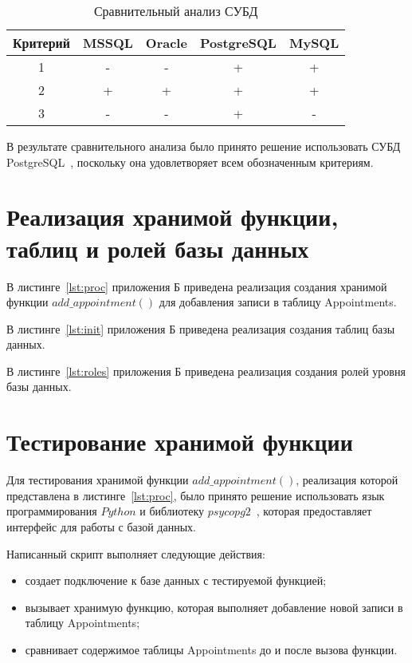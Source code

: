 \begin{table}[!ht]
	\begin{center}
		\caption{Сравнительный анализ СУБД}
		\label{tbl:analysis}
		\begin{tabular}{|c|c|c|c|c|}
			\hline
			Критерий & MSSQL & Oracle & PostgreSQL & MySQL \\ \hline
			1        & -     & -      & +          & +     \\ \hline
			2        & +     & +      & +          & +     \\ \hline
			3        & -     & -      & +          & -     \\ \hline
		\end{tabular}
	\end{center}
\end{table}

В результате сравнительного анализа было принято решение использовать СУБД PostgreSQL~\cite{psql}, поскольку она удовлетворяет всем обозначенным критериям.

\section{Реализация хранимой функции, таблиц и ролей базы данных}
В листинге~\ref{lst:proc} приложения Б приведена реализация создания хранимой функции $add\_appointment()$ для добавления записи в таблицу Appointments.

В листинге~\ref{lst:init} приложения Б приведена реализация создания таблиц базы данных.

В листинге~\ref{lst:roles} приложения Б приведена реализация создания ролей уровня базы данных.

\clearpage
\section{Тестирование хранимой функции}

Для тестирования хранимой функции $add\_appointment()$, реализация которой представлена в листинге~\ref{lst:proc}, было принято решение использовать язык программирования $Python$ и библиотеку $psycopg2$~\cite{psycopg}, которая предоставляет интерфейс для работы с базой данных.

Написанный скрипт выполняет следующие действия:
\begin{itemize}
	\item создает подключение к базе данных с тестируемой функцией;
	\item вызывает хранимую функцию, которая выполняет добавление новой записи в таблицу Appointments;
	\item сравнивает содержимое таблицы Appointments до и после вызова функции.
\end{itemize}

